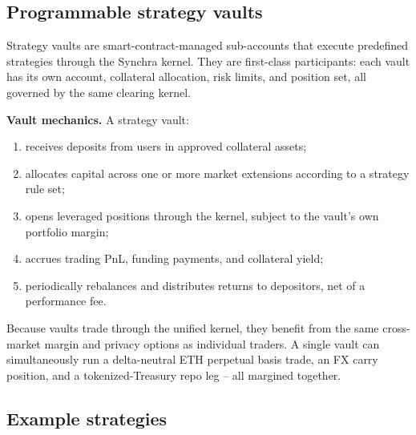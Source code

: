 \documentclass[11pt,a4paper]{article}
\begin{document}
\subsection{Programmable strategy vaults}

Strategy vaults are smart-contract-managed sub-accounts that execute predefined strategies through the Synchra kernel. They are first-class participants: each vault has its own account, collateral allocation, risk limits, and position set, all governed by the same clearing kernel.

\textbf{Vault mechanics.} A strategy vault:
\begin{enumerate}
  \item receives deposits from users in approved collateral assets;
  \item allocates capital across one or more market extensions according to a strategy rule set;
  \item opens leveraged positions through the kernel, subject to the vault's own portfolio margin;
  \item accrues trading PnL, funding payments, and collateral yield;
  \item periodically rebalances and distributes returns to depositors, net of a performance fee.
\end{enumerate}

Because vaults trade through the unified kernel, they benefit from the same cross-market margin and privacy options as individual traders. A single vault can simultaneously run a delta-neutral ETH perpetual basis trade, an FX carry position, and a tokenized-Treasury repo leg -- all margined together.

\subsection{Example strategies}
\end{document}
